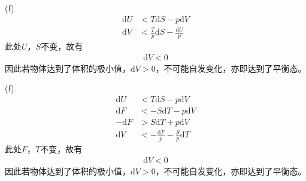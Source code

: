 \documentclass{phyasgn}
\renewcommand{\d}{\mathrm{d}}
\begin{document}
\begin{sol}[1]
    (f)\begin{align*}
        \d U&<T\d S-p\d V\\
        \d V&<\frac{T}{p}\d S-\frac{\d U}{p}
    \end{align*}
    此处$U$，$S$不变，故有
    \begin{align*}
        \d V<0
    \end{align*}
    因此若物体达到了体积的极小值，$\d V>0$，不可能自发变化，亦即达到了平衡态。

    (f)\begin{align*}
        \d U&<T\d S-p\d V\\
        \d F&<-S\d T-p\d V\\
        -\d F&>S\d T+p\d V\\
        \d V&<-\frac{\d F}{p}-\frac{S}{p}\d T
    \end{align*}
    此处$F$，$T$不变，故有
    \begin{align*}
        \d V<0
    \end{align*}
    因此若物体达到了体积的极小值，$\d V>0$，不可能自发变化，亦即达到了平衡态。
\end{sol}\par
\end{document}
